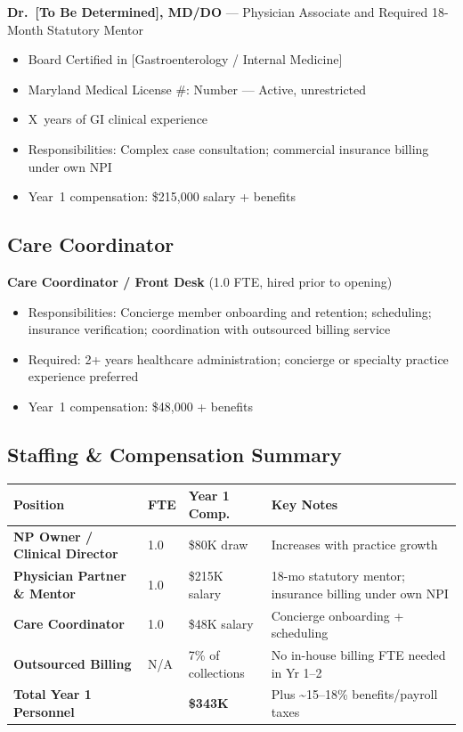 \documentclass[11pt,letterpaper]{article}
\newcommand{\thead}[1]{\cellcolor{navy}\color{white}\bfseries\small #1}
\newcommand{\trow}{\rowcolor{rowshade}}
\newcommand{\ttotalrow}{\rowcolor{totalrow}}
\newcommand{\physicianname}{[To Be Determined]}
\newcommand{\physicianspecialty}{[Gastroenterology / Internal Medicine]}
\newcommand{\physicianlicense}{Number}
\newcommand{\physicianexperience}{X}
\begin{document}
\textbf{Dr.~\physicianname, MD/DO} --- Physician Associate and Required 18-Month Statutory Mentor

\begin{itemize}
  \item Board Certified in \physicianspecialty
  \item Maryland Medical License \#: \physicianlicense{} --- Active, unrestricted
  \item \physicianexperience\ years of GI clinical experience
  \item Responsibilities: Complex case consultation; commercial insurance billing under own NPI
  \item Year~1 compensation: \$215,000 salary + benefits
\end{itemize}

\subsection{Care Coordinator}

\textbf{Care Coordinator / Front Desk} (1.0 FTE, hired prior to opening)

\begin{itemize}
  \item Responsibilities: Concierge member onboarding and retention; scheduling; insurance verification; coordination with outsourced billing service
  \item Required: 2+ years healthcare administration; concierge or specialty practice experience preferred
  \item Year~1 compensation: \$48,000 + benefits
\end{itemize}

\subsection{Staffing \& Compensation Summary}

\vspace{6pt}
\begin{tabularx}{\linewidth}{|>{\bfseries\small}p{3.6cm}|>{\small}p{1.1cm}|>{\small}p{2.2cm}|>{\small}X|}
\hline
\thead{Position} & \thead{FTE} & \thead{Year 1 Comp.} & \thead{Key Notes} \\
\hline
\trow NP Owner / Clinical Director & 1.0 & \$80K draw & Increases with practice growth \\
Physician Partner \& Mentor & 1.0 & \$215K salary & 18-mo statutory mentor; insurance billing under own NPI \\
\trow Care Coordinator & 1.0 & \$48K salary & Concierge onboarding + scheduling \\
Outsourced Billing & N/A & 7\% of collections & No in-house billing FTE needed in Yr 1--2 \\
\hline
\ttotalrow \textbf{Total Year 1 Personnel} & & \textbf{\$343K} & Plus \textasciitilde15--18\% benefits/payroll taxes \\
\hline
\end{tabularx}
\end{document}
